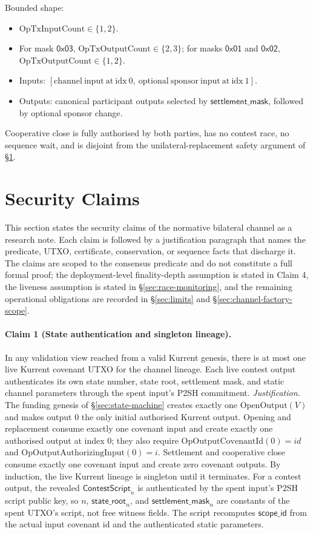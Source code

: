 \documentclass[10pt,a4paper]{article}
\begin{document}
Bounded shape:
\begin{itemize}
  \item $\mathrm{OpTxInputCount}\in\{1,2\}$.
  \item For mask $\mathsf{0x03}$, $\mathrm{OpTxOutputCount}\in\{2,3\}$; for masks $\mathsf{0x01}$ and $\mathsf{0x02}$, $\mathrm{OpTxOutputCount}\in\{1,2\}$.
  \item Inputs: $[\mathrm{channel\ input\ at\ idx\ }0,\ \mathrm{optional\ sponsor\ input\ at\ idx\ }1]$.
  \item Outputs: canonical participant outputs selected by $\mathsf{settlement\_mask}$, followed by optional sponsor change.
\end{itemize}
Cooperative close is fully authorised by both parties, has no contest race, no sequence wait, and is disjoint from the unilateral-replacement safety argument of §\ref{sec:security}.

\section{Security Claims}
\label{sec:security}

This section states the security claims of the normative bilateral channel as a research note. Each claim is followed by a justification paragraph that names the predicate, UTXO, certificate, conservation, or sequence facts that discharge it. The claims are scoped to the consensus predicate and do not constitute a full formal proof; the deployment-level finality-depth assumption is stated in Claim 4, the liveness assumption is stated in \S\ref{sec:race-monitoring}, and the remaining operational obligations are recorded in \S\ref{sec:limits} and \S\ref{sec:channel-factory-scope}.

\paragraph{Claim 1 (State authentication and singleton lineage).} In any validation view reached from a valid Kurrent genesis, there is at most one live Kurrent covenant UTXO for the channel lineage. Each live contest output authenticates its own state number, state root, settlement mask, and static channel parameters through the spent input's P2SH commitment. \emph{Justification.} The funding genesis of §\ref{sec:state-machine} creates exactly one $\mathrm{OpenOutput}(V)$ and makes output 0 the only initial authorised Kurrent output. Opening and replacement consume exactly one covenant input and create exactly one authorised output at index 0; they also require $\mathrm{OpOutputCovenantId}(0)=id$ and $\mathrm{OpOutputAuthorizingInput}(0)=i$. Settlement and cooperative close consume exactly one covenant input and create zero covenant outputs. By induction, the live Kurrent lineage is singleton until it terminates. For a contest output, the revealed $\mathsf{ContestScript}_n$ is authenticated by the spent input's P2SH script public key, so $n$, $\mathsf{state\_root}_n$, and $\mathsf{settlement\_mask}_n$ are constants of the spent UTXO's script, not free witness fields. The script recomputes $\mathsf{scope\_id}$ from the actual input covenant id and the authenticated static parameters.
\end{document}
